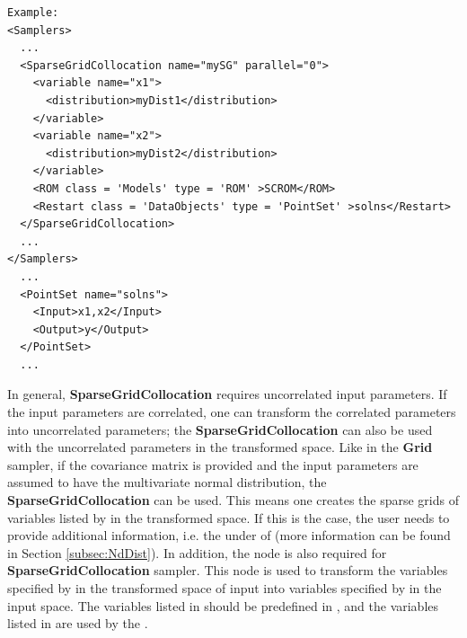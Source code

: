 
\footnotesize
\begin{lstlisting}[style=XML]
Example:
<Samplers>
  ...
  <SparseGridCollocation name="mySG" parallel="0">
    <variable name="x1">
      <distribution>myDist1</distribution>
    </variable>
    <variable name="x2">
      <distribution>myDist2</distribution>
    </variable>
    <ROM class = 'Models' type = 'ROM' >SCROM</ROM>
    <Restart class = 'DataObjects' type = 'PointSet' >solns</Restart>
  </SparseGridCollocation>
  ...
</Samplers>
  ...
  <PointSet name="solns">
    <Input>x1,x2</Input>
    <Output>y</Output>
  </PointSet>
  ...
\end{lstlisting}
 \normalsize

In general, \textbf{SparseGridCollocation} requires uncorrelated input parameters. If the input parameters are correlated, one can transform the
correlated parameters into uncorrelated parameters; the \textbf{SparseGridCollocation} can also be used with the uncorrelated parameters
in the transformed space. Like in the \textbf{Grid} sampler, if the covariance matrix is provided
and the input parameters are assumed to have the multivariate normal distribution, the \textbf{SparseGridCollocation} can be used.
This means one creates the sparse grids of variables listed by  in the transformed space. If this is
the case, the user needs to provide additional information, i.e. the  under 
of  (more information can be found in Section \ref{subsec:NdDist}). In addition, the node
 is also required for \textbf{SparseGridCollocation} sampler. This node is used to transform
the variables specified by  in the transformed space of input into variables specified by
 in the input space. The variables listed in  should be predefined
in , and the variables listed in 
are used by the .



